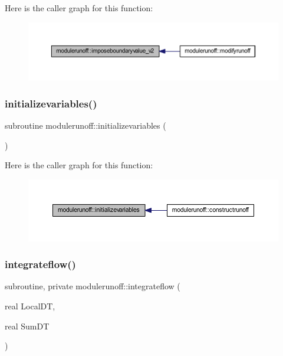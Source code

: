 Here is the caller graph for this function\+:
\nopagebreak
\begin{figure}[H]
\begin{center}
\leavevmode
\includegraphics[width=350pt]{namespacemodulerunoff_acf9771f898b15e849b1eaba077dd0d83_icgraph}
\end{center}
\end{figure}
\mbox{\label{namespacemodulerunoff_a99a2963d7ce8cb790b9fa53c6c936329}} 
\subsubsection{\texorpdfstring{initializevariables()}{initializevariables()}}
{\footnotesize\ttfamily subroutine modulerunoff\+::initializevariables (\begin{DoxyParamCaption}{ }\end{DoxyParamCaption})\hspace{0.3cm}{\ttfamily [private]}}

Here is the caller graph for this function\+:
\nopagebreak
\begin{figure}[H]
\begin{center}
\leavevmode
\includegraphics[width=350pt]{namespacemodulerunoff_a99a2963d7ce8cb790b9fa53c6c936329_icgraph}
\end{center}
\end{figure}
\mbox{\label{namespacemodulerunoff_ad94c220c4dbba10ee5046785e9e782e9}} 
\subsubsection{\texorpdfstring{integrateflow()}{integrateflow()}}
{\footnotesize\ttfamily subroutine, private modulerunoff\+::integrateflow (\begin{DoxyParamCaption}\item[{real}]{Local\+DT,  }\item[{real}]{Sum\+DT }\end{DoxyParamCaption})\hspace{0.3cm}{\ttfamily [private]}}

